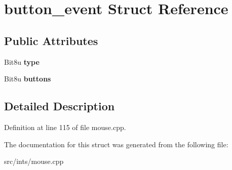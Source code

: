 \hypertarget{structbutton__event}{\section{button\-\_\-event Struct Reference}
\label{structbutton__event}
}
\subsection*{Public Attributes}
\begin{DoxyCompactItemize}
\item 
\hypertarget{structbutton__event_a793d0b44cf9339bd85bd3d571830fa51}{Bit8u {\bfseries type}}\label{structbutton__event_a793d0b44cf9339bd85bd3d571830fa51}

\item 
\hypertarget{structbutton__event_abacaa182c19fa91de5e17ee325f6fe88}{Bit8u {\bfseries buttons}}\label{structbutton__event_abacaa182c19fa91de5e17ee325f6fe88}

\end{DoxyCompactItemize}


\subsection{Detailed Description}


Definition at line 115 of file mouse.\-cpp.



The documentation for this struct was generated from the following file\-:\begin{DoxyCompactItemize}
\item 
src/ints/mouse.\-cpp\end{DoxyCompactItemize}
